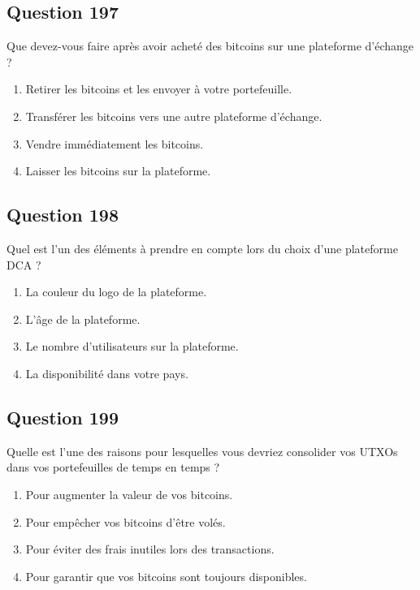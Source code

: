 \documentclass[12pt,a4paper]{article}
\begin{document}
\bigskip


\subsection*{Question 197}
Que devez-vous faire après avoir acheté des bitcoins sur une plateforme d'échange ?

\begin{enumerate}[label=\Alph*., leftmargin=*]
\item Retirer les bitcoins et les envoyer à votre portefeuille.
\item Transférer les bitcoins vers une autre plateforme d'échange.
\item Vendre immédiatement les bitcoins.
\item Laisser les bitcoins sur la plateforme.
\end{enumerate}

\bigskip


\subsection*{Question 198}
Quel est l'un des éléments à prendre en compte lors du choix d'une plateforme DCA ?

\begin{enumerate}[label=\Alph*., leftmargin=*]
\item La couleur du logo de la plateforme.
\item L'âge de la plateforme.
\item Le nombre d'utilisateurs sur la plateforme.
\item La disponibilité dans votre pays.
\end{enumerate}

\bigskip


\subsection*{Question 199}
Quelle est l'une des raisons pour lesquelles vous devriez consolider vos UTXOs dans vos portefeuilles de temps en temps ?

\begin{enumerate}[label=\Alph*., leftmargin=*]
\item Pour augmenter la valeur de vos bitcoins.
\item Pour empêcher vos bitcoins d'être volés.
\item Pour éviter des frais inutiles lors des transactions.
\item Pour garantir que vos bitcoins sont toujours disponibles.
\end{enumerate}
\end{document}
